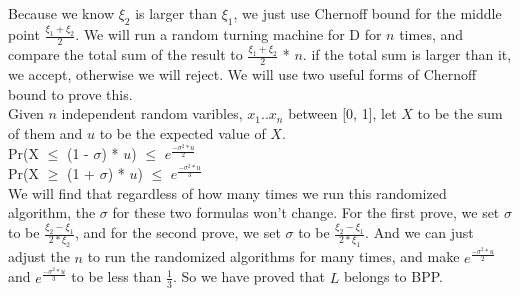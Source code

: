\documentclass[11pt]{article}
\begin{document}
\part{}
Because we know $\xi_{2}$ is larger than $\xi_{1}$, we just use Chernoff bound for the middle point $\frac{\xi_{1} + \xi_{2}}{2}$.
We will run a random turning machine for D for $n$ times, and compare the total sum of the result to $\frac{\xi_{1} + \xi_{2}}{2}$ * $n$. if the total sum is larger than it, we accept, otherwise we will reject. We will use two useful forms of Chernoff bound to prove this. \\
Given $n$ independent random varibles, $x_{1}$..$x_{n}$ between [0, 1], let $X$ to be the sum of them and $u$ to be the expected value of $X$. \\
Pr(X $\leq$ (1 - $\sigma$) * $u$) $\leq$ $e^{\frac{-\sigma^{2}*u}{2}}$ \\
Pr(X $\geq$ (1 + $\sigma$) * $u$) $\leq$ $e^{\frac{-\sigma^{2}*u}{3}}$ \\
We will find that regardless of how many times we run this randomized algorithm, the $\sigma$ for these two formulas won't change. For the first prove, we set $\sigma$ to be $\frac{\xi_{2} - \xi_{1}}{2*\xi_{2}}$, and for the second prove, we set $\sigma$ to be $\frac{\xi_{2} - \xi_{1}}{2*\xi_{1}}$. And we can just adjust the $n$ to run the randomized algorithms for many times, and make $e^{\frac{-\sigma^{2}*u}{2}}$ and $e^{\frac{-\sigma^{2}*u}{3}}$ to be less than $\frac{1}{3}$. So we have proved that $L$ belongs to BPP.

\part{}

\part{}
\end{document}
